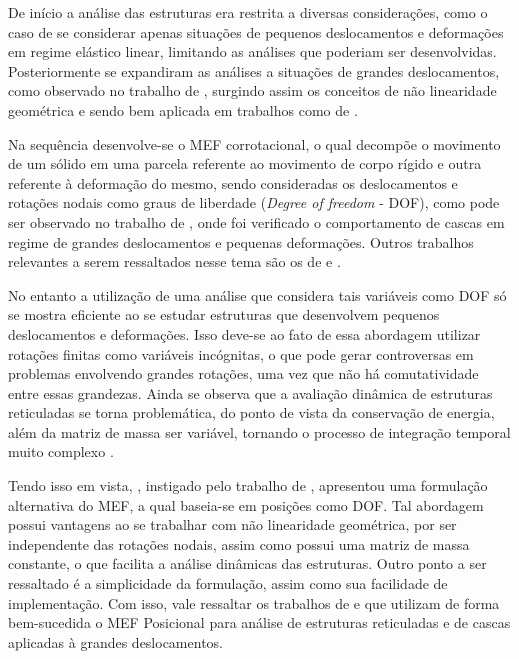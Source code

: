 De início a análise das estruturas era restrita a diversas considerações, como o caso de se considerar apenas situações de pequenos deslocamentos e deformações em regime elástico linear, limitando as análises que poderiam ser desenvolvidas. Posteriormente se expandiram as análises a situações de grandes deslocamentos, como observado no trabalho de , surgindo assim os conceitos de não linearidade geométrica e sendo bem aplicada em trabalhos como de .

Na sequência desenvolve-se o MEF corrotacional, o qual decompõe o movimento de um sólido em uma parcela referente ao movimento de corpo rígido e outra referente à deformação do mesmo, sendo consideradas os deslocamentos e rotações nodais como graus de liberdade (\textit{Degree of freedom} - DOF), como pode ser observado no trabalho de , onde foi verificado o comportamento de cascas em regime de grandes deslocamentos e pequenas deformações. Outros trabalhos relevantes a serem ressaltados nesse tema são os de  e .

No entanto a utilização de uma análise que considera tais variáveis como DOF só se mostra eficiente ao se estudar estruturas que desenvolvem pequenos deslocamentos e deformações. Isso deve-se ao fato de essa abordagem utilizar rotações finitas como variáveis incógnitas, o que pode gerar controversas em problemas envolvendo grandes rotações, uma vez que não há comutatividade entre essas grandezas. Ainda se observa que a avaliação dinâmica de estruturas reticuladas se torna problemática, do ponto de vista da conservação de energia, além da matriz de massa ser variável, tornando o processo de integração temporal muito complexo \cite{sanches2013unconstrained}.

Tendo isso em vista, , instigado pelo trabalho de , apresentou uma formulação alternativa do MEF, a qual baseia-se em posições como DOF. Tal abordagem possui vantagens ao se trabalhar com não linearidade geométrica, por ser independente das rotações nodais, assim como possui uma matriz de massa constante, o que facilita a análise dinâmicas das estruturas. Outro ponto a ser ressaltado é a simplicidade da formulação, assim como sua facilidade de implementação. Com isso, vale ressaltar os trabalhos de  e  que utilizam de forma bem-sucedida o MEF Posicional para análise de estruturas reticuladas e de cascas aplicadas à grandes deslocamentos.

